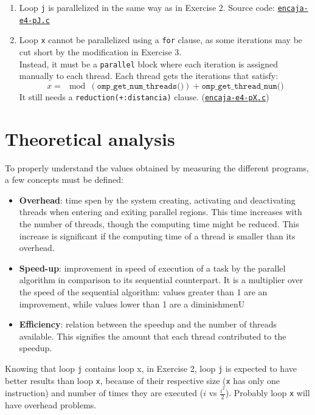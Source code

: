\documentclass[a4paper]{article}
\newcommand{\github}{https://github.com/kauron/etsinf3/tree/master/CPA/lab2}
\newcommand{\gitline}[2]{\texttt{\href{\github /src/#1#2}{#1}}}
\begin{document}
\begin{enumerate}
\begin{enumerate}
        \item Loop \texttt{j} is parallelized in the same way as in Exercise 2. Source code: \gitline{encaja-e4-pJ.c}{\#L118}
        \item Loop \texttt{x} cannot be parallelized using a \texttt{for} clause, as some iterations may be cut short by the modification in Exercise 3.\\ Instead, it must be a \texttt{parallel} block where each iteration is assigned manually to each thread. Each thread gets the iterations that satisfy: $$x = \mod(\texttt{omp\_get\_num\_threads()}) + \texttt{omp\_get\_thread\_num()}$$ It still needs a \texttt{reduction(+:distancia)} clause. (\gitline{encaja-e4-pX.c}{\#L120})
    \end{enumerate}
\end{enumerate}

\section{Theoretical analysis}
\label{sec:theoretical}
To properly understand the values obtained by measuring the different programs, a few concepts must be defined:
\begin{itemize}
	\item \textbf{Overhead}: time spen by the system creating, activating and deactivating threads when entering and exiting parallel regions. This time increases with the number of threads, though the computing time might be reduced. This increase is significant if the computing time of a thread is smaller than its overhead.
	\item \textbf{Speed-up}: improvement in speed of execution of a task by the parallel algorithm in comparison to its sequential counterpart. It is a multiplier over the speed of the sequential algorithm: values greater than 1 are an improvement, while values lower than 1 are a diminishmenU
	\item \textbf{Efficiency}: relation between the speedup and the number of threads available. This signifies the amount that each thread contributed to the speedup.
\end{itemize}

Knowing that loop \texttt{j} contains loop {x}, in Exercise 2, loop \texttt{j} is expected to have better results than loop \texttt{x}, because of their respective size (\texttt{x} has only one instruction) and number of times they are executed ($i$ vs $\frac{i^2}{2}$). Probably loop \texttt{x} will have overhead problems.
\end{document}
